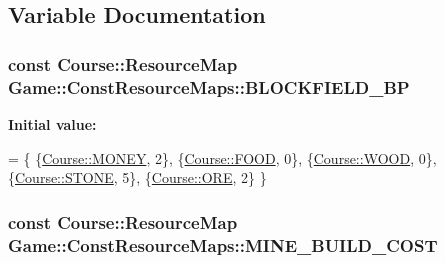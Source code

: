 \subsection{Variable Documentation}
\hypertarget{namespaceGame_1_1ConstResourceMaps_aca102e5c0cc70c09b1934a785bca2b91}{
\subsubsection[{B\-L\-O\-C\-K\-F\-I\-E\-L\-D\-\_\-\-B\-P}]{\setlength{\rightskip}{0pt plus 5cm}const {\bf Course\-::\-Resource\-Map} Game\-::\-Const\-Resource\-Maps\-::\-B\-L\-O\-C\-K\-F\-I\-E\-L\-D\-\_\-\-B\-P}}\label{namespaceGame_1_1ConstResourceMaps_aca102e5c0cc70c09b1934a785bca2b91}
{\bfseries Initial value\-:}
\begin{DoxyCode}
= \{
    \{\hyperlink{namespaceCourse_a02d49c04029594d4adba79b84bb85f65aff016add6bbbdbb44abf1d2d7f215ec0}{Course::MONEY}, 2\},
    \{\hyperlink{namespaceCourse_a02d49c04029594d4adba79b84bb85f65a7018c47af38bfc1390a89e70b4cf4760}{Course::FOOD}, 0\},
    \{\hyperlink{namespaceCourse_a02d49c04029594d4adba79b84bb85f65a87287be3009253b983ffb2e9f91eef22}{Course::WOOD}, 0\},
    \{\hyperlink{namespaceCourse_a02d49c04029594d4adba79b84bb85f65a8598c3079c2be7785410e724cc190229}{Course::STONE}, 5\},
    \{\hyperlink{namespaceCourse_a02d49c04029594d4adba79b84bb85f65af416a215c7dad21349df38d35be0a1e1}{Course::ORE}, 2\}
\}
\end{DoxyCode}
\hypertarget{namespaceGame_1_1ConstResourceMaps_adda0aad5b2188a57d2d187f692e2c2f9}{
\subsubsection[{M\-I\-N\-E\-\_\-\-B\-U\-I\-L\-D\-\_\-\-C\-O\-S\-T}]{\setlength{\rightskip}{0pt plus 5cm}const {\bf Course\-::\-Resource\-Map} Game\-::\-Const\-Resource\-Maps\-::\-M\-I\-N\-E\-\_\-\-B\-U\-I\-L\-D\-\_\-\-C\-O\-S\-T}}\label{namespaceGame_1_1ConstResourceMaps_adda0aad5b2188a57d2d187f692e2c2f9}
